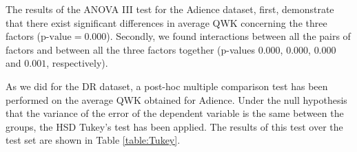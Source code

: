 \documentclass[journal]{IEEEtran}
\begin{document}
	
	The results of the ANOVA III test for the Adience dataset, first, demonstrate that there exist significant differences in average QWK concerning the three factors ($\text{p-value} = 0.000$). Secondly, we found interactions between all the pairs of factors and between all the three factors together (p-values $0.000$, $0.000$, $0.000$ and $0.001$, respectively).
	
	As we did for the DR dataset, a post-hoc multiple comparison test has been performed on the average QWK obtained for Adience. Under the null hypothesis that the variance of the error of the dependent variable is the same between the groups, the HSD Tukey's test has been applied. The results of this test over the test set are shown in Table \ref{table:Tukey}.
	
\end{document}
